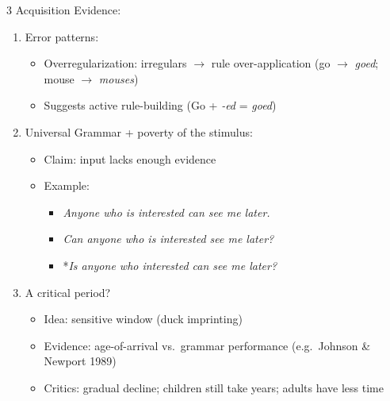 \documentclass[12pt, a4paper]{article}
\begin{document}
\begin{multicols*}{3}
\colbreak
Acquisition Evidence:
\begin{enumerate}[\roman*.]
  \item Error patterns:
    \begin{itemize}[leftmargin=*]\vspace{3pt}
      \item Overregularization: irregulars $\rightarrow$ rule over-application (go $\rightarrow$ \textit{goed}; mouse $\rightarrow$ \textit{mouses})
      \item Suggests active rule-building (Go + \textit{-ed} = \textit{goed})
    \end{itemize}
  \item Universal Grammar + poverty of the stimulus:
    \begin{itemize}[leftmargin=*]\vspace{3pt}
      \item Claim: input lacks enough evidence 
      \item Example:
        \begin{itemize}[leftmargin=*]\vspace{2pt}
          \item \textit{Anyone who is interested can see me later.}
          \item \textit{Can anyone who is interested see me later?}
          \item *\textit{Is anyone who interested can see me later?}
        \end{itemize}
    \end{itemize}
  \item A critical period?
    \begin{itemize}[leftmargin=*]\vspace{3pt}
      \item Idea: sensitive window (duck imprinting)
      \item Evidence: age-of-arrival vs.\ grammar performance (e.g.\ Johnson \& Newport 1989)
      \item Critics: gradual decline; children still take years; adults have less time
    \end{itemize}
\end{enumerate}


\end{multicols*}
\end{document}
